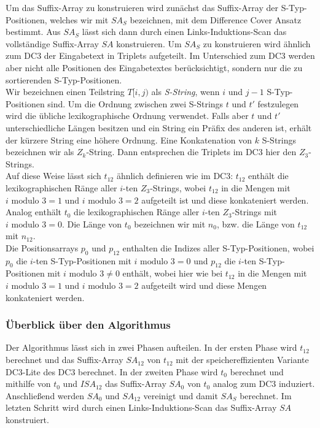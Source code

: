 Um das Suffix-Array zu konstruieren wird zunächst das Suffix-Array der S-Typ-Positionen, welches wir mit $SA_S$ bezeichnen, mit dem Difference Cover Ansatz bestimmt. Aus $SA_S$ lässt sich dann durch einen Links-Induktions-Scan das vollständige Suffix-Array $SA$ konstruieren. Um $SA_S$ zu konstruieren wird ähnlich zum DC3 der Eingabetext in Triplets aufgeteilt. Im Unterschied zum DC3 werden aber nicht alle Positionen des Eingabetextes berücksichtigt, sondern nur die zu sortierenden S-Typ-Positionen. \\
Wir bezeichnen einen Teilstring $T[i,j)$ als \textit{S-String}, wenn $i$ und $j-1$ S-Typ-Positionen sind. Um die Ordnung zwischen zwei S-Strings $t$ und $t'$ festzulegen wird die übliche lexikographische Ordnung verwendet. Falls aber $t$ und $t'$ unterschiedliche Längen besitzen und ein String ein Präfix des anderen ist, erhält der kürzere String eine höhere Ordnung.  Eine Konkatenation von $k$ S-Strings bezeichnen wir als $Z_k$-String. Dann entsprechen die Triplets im DC3 hier den $Z_3$-Strings. \\
Auf diese Weise lässt sich $t_{12}$ ähnlich definieren wie im DC3: $t_{12}$ enthält die lexikographischen Ränge aller $i$-ten $Z_3$-Strings, wobei $t_{12}$ in die Mengen mit $i \text{ modulo } 3 = 1$ und $i \text{ modulo } 3 = 2$ aufgeteilt ist und diese konkateniert werden. Analog enthält $t_0$ die lexikographischen Ränge aller $i$-ten $Z_3$-Strings mit $i \text{ modulo } 3 = 0$. Die Länge von $t_0$ bezeichnen wir mit $n_0$, bzw. die Länge von $t_{12}$ mit $n_{12}$.\\
Die Positionsarrays $p_0$ und $p_{12}$ enthalten die Indizes aller S-Typ-Positionen, wobei $p_0$ die $i$-ten S-Typ-Positionen mit $i \text{ modulo } 3 = 0$ und $p_{12}$ die $i$-ten S-Typ-Positionen mit $i \text{ modulo } 3 \ne 0$ enthält, wobei hier wie bei $t_{12}$ in die Mengen mit $i \text{ modulo } 3 = 1$ und $i \text{ modulo } 3 = 2$ aufgeteilt wird und diese Mengen konkateniert werden. \\

\subsubsection{Überblick über den Algorithmus}

Der Algorithmus lässt sich in zwei Phasen aufteilen. In der ersten Phase wird $t_{12}$ berechnet und das Suffix-Array $SA_{12}$ von $t_{12}$ mit der speichereffizienten Variante DC3-Lite des DC3 berechnet. In der zweiten Phase wird $t_0$ berechnet und mithilfe von $t_0$ und $ISA_{12}$ das Suffix-Array $SA_0$ von $t_0$ analog zum DC3 induziert. Anschließend werden $SA_0$ und $SA_{12}$ vereinigt und damit $SA_S$ berechnet. Im letzten Schritt wird durch einen Links-Induktions-Scan das Suffix-Array $SA$ konstruiert. \\

